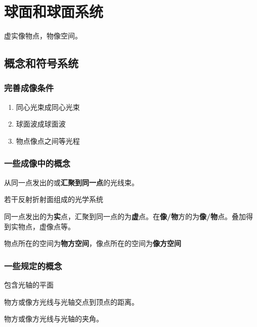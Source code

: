 
\section{球面和球面系统}
虚实像物点，物像空间。
\subsection{概念和符号系统}
\subsubsection{完善成像条件}
\begin{enumerate}[nosep]%
    \item 同心光束成同心光束
    \item 球面波成球面波
    \item 物点像点之间等光程
\end{enumerate}
\subsubsection{一些成像中的概念}
\begin{description}[leftmargin=1.7cm,style=nextline,nosep]%
    \item[同心光束] 从同一点发出的或\textbf{汇聚到同一点}的光线束。
    \item[光具组] 若干反射折射面组成的光学系统
    \item[虚实像物点] 同一点发出的为\textbf{实}点，汇聚到同一点的为\textbf{虚}点。在\textbf{像/物}方的为\textbf{像/物}点。叠加得到实物点，虚像点等。
    \item[像物方空间] 物点所在的空间为\textbf{物方空间}，像点所在的空间为\textbf{像方空间}
    \item[完善像点]
\end{description}
\subsubsection{一些规定的概念}
\begin{description}[leftmargin=1.7cm,style=nextline,nosep]%
    \item[子午平面] 包含光轴的平面
    \item[截距] 物方或像方光线与光轴交点到顶点的距离。
    \item[倾斜角] 物方或像方光线与光轴的夹角。
\end{description}
